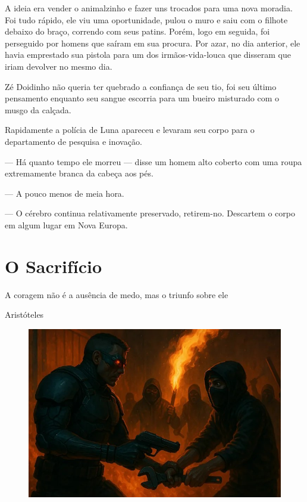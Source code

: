 \documentclass[a4paper,14pt]{book}
\begin{document}
A ideia era vender o animalzinho e fazer uns trocados para uma nova moradia. Foi tudo rápido, ele viu uma oportunidade, pulou o muro e saiu com o filhote debaixo do braço, correndo com seus patins. Porém, logo em seguida, foi perseguido por homens que saíram em sua procura. Por azar, no dia anterior, ele havia emprestado sua pistola para um dos irmãos-vida-louca que disseram que iriam devolver no mesmo dia.

Zé Doidinho não queria ter quebrado a confiança de seu tio, foi seu último pensamento enquanto seu sangue escorria para um bueiro misturado com o musgo da calçada.

Rapidamente a polícia de Luna apareceu e levaram seu corpo para o departamento de pesquisa e inovação.

— Há quanto tempo ele morreu — disse um homem alto coberto com uma roupa extremamente branca da cabeça aos pés.

— A pouco menos de meia hora.

— O cérebro continua relativamente preservado, retirem-no. Descartem o corpo em algum lugar em Nova Europa.


\chapter{O Sacrifício}

\epigraph{A coragem não é a ausência de medo, mas o triunfo sobre ele}{Aristóteles}

\begin{figure}[h!]
    \includegraphics[width=1\linewidth]{img/o_sacrificio.jpg}
\end{figure}
\end{document}
